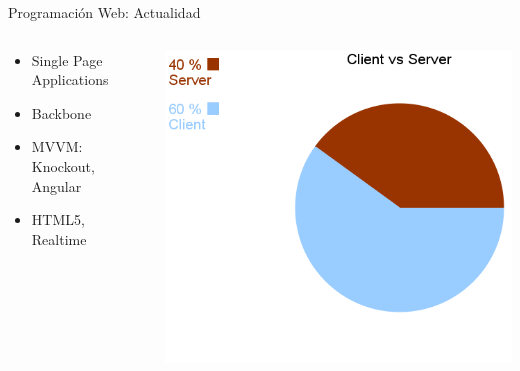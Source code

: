 \documentclass[xcolor=dvipsnames, 14pt]{beamer}
\begin{document}
\begin{frame}{Programación Web: Actualidad}

\begin{columns}[c]
    \begin{column}{0.5\textwidth}
        \begin{itemize}
            \item Single Page Applications
            \item Backbone
            \item MVVM: Knockout, Angular
            \item HTML5, Realtime
        \end{itemize}
    \end{column}
    \begin{column}{0.5\textwidth}
        \begin{center}
            \includegraphics[width=\textwidth]{img/actualidad2.png}
        \end{center}
    \end{column}
\end{columns}

\end{frame}
\end{document}

